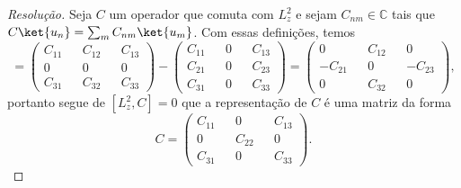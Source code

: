 \begin{proof}[Resolução]
    Seja \(C\) um operador que comuta com \(L_z^2\) e sejam \(C_{nm} \in \mathbb{C}\) tais que \(C\ket{u_n} = \sum_{m} C_{nm}\ket{u_m}\). Com essas definições, temos
    \begin{equation*}
        [L_z^2, C] = \begin{pmatrix}
            C_{11} && C_{12} && C_{13}\\
            0 && 0 && 0\\
            C_{31} && C_{32} && C_{33}
        \end{pmatrix} - \begin{pmatrix}
            C_{11} && 0 && C_{13}\\
            C_{21} && 0 && C_{23}\\
            C_{31} && 0 && C_{33}
        \end{pmatrix} =
        \begin{pmatrix}
            0 && C_{12} && 0\\
            -C_{21} && 0 && -C_{23}\\
            0 && C_{32} && 0
        \end{pmatrix},
    \end{equation*}
    portanto segue de \([L_z^2,C] = 0\) que a representação de \(C\) é uma matriz da forma
    \begin{equation*}
        C =
        \begin{pmatrix}
            C_{11} && 0 && C_{13}\\
            0 && C_{22} && 0\\
            C_{31} && 0 && C_{33}
        \end{pmatrix}.
    \end{equation*}


\end{proof}
